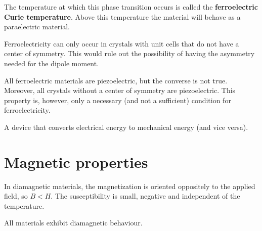     The temperature at which this phase transition occurs is called the \textbf{ferroelectric Curie temperature}. Above this temperature the material will behave as a paraelectric material.

   \begin{remark}
       Ferroelectricity can only occur in crystals with unit cells that do not have a center of symmetry. This would rule out the possibility of having the asymmetry needed for the dipole moment.
   \end{remark}


    \begin{remark}
        All ferroelectric materials are piezoelectric, but the converse is not true. Moreover, all crystals without a center of symmetry are piezoelectric. This property is, however, only a necessary (and not a sufficient) condition for ferroelectricity.
    \end{remark}

    \begin{example}[Transducer]
        A device that converts electrical energy to mechanical energy (and vice versa).
    \end{example}

\section{Magnetic properties}

    \begin{definition}[Diamagnetism]
        In diamagnetic materials, the magnetization is oriented oppositely to the applied field, so $B<H$. The susceptibility is small, negative and independent of the temperature.
    \end{definition}
    \begin{remark}
        All materials exhibit diamagnetic behaviour.
    \end{remark}

